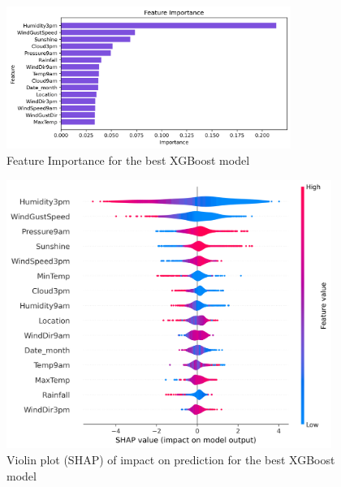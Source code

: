\documentclass{article}%
\begin{document}
%


\begin{figure}[h!]%
\centering%
\includegraphics[width=350px]{XAI/XGBoost/feature_importance.png}%
\caption{Feature Importance for the best XGBoost model}%
\end{figure}

%


\begin{figure}[h!]%
\centering%
\includegraphics[width=400px]{XAI/XGBoost/violin_summary_plot_shap.png}%
\caption{Violin plot (SHAP) of impact on prediction for the best XGBoost model}%
\end{figure}

%
\end{document}
